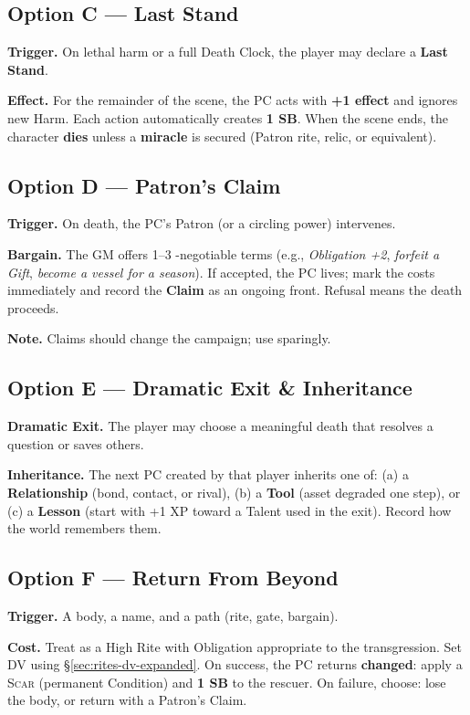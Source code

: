 \subsection*{Option C — Last Stand}\label{subsec:last-stand}
\textbf{Trigger.} On lethal harm or a full Death Clock, the player may declare a \textbf{Last Stand}.\par
\textbf{Effect.} For the remainder of the scene, the PC acts with \textbf{+1 effect} and ignores new Harm. Each action automatically creates \textbf{1 SB}. When the scene ends, the character \textbf{dies} unless a \textbf{miracle} is secured (Patron rite, relic, or equivalent).

\subsection*{Option D — Patron’s Claim}\label{subsec:patron-claim}
\textbf{Trigger.} On death, the PC’s Patron (or a circling power) intervenes.\par
\textbf{Bargain.} The GM offers 1–3 \non-negotiable terms (e.g., \emph{Obligation +2}, \emph{forfeit a Gift}, \emph{become a vessel for a season}). If accepted, the PC lives; mark the costs immediately and record the \textbf{Claim} as an ongoing front. Refusal means the death proceeds.\par
\textbf{Note.} Claims should change the campaign; use sparingly.

\subsection*{Option E — Dramatic Exit & Inheritance}\label{subsec:inheritance}
\textbf{Dramatic Exit.} The player may choose a meaningful death that resolves a question or saves others.\par
\textbf{Inheritance.} The next PC created by that player inherits one of: (a) a \textbf{Relationship} (bond, contact, or rival), (b) a \textbf{Tool} (asset degraded one step), or (c) a \textbf{Lesson} (start with +1 XP toward a Talent used in the exit). Record how the world remembers them.

\subsection*{Option F — Return From Beyond}\label{subsec:return}
\textbf{Trigger.} A body, a name, and a path (rite, gate, bargain).\par
\textbf{Cost.} Treat as a High Rite with Obligation appropriate to the transgression. Set DV using \S\ref{sec:rites-dv-expanded}. On success, the PC returns \textbf{changed}: apply a \textsc{Scar} (permanent Condition) and \textbf{1 SB} to the rescuer. On failure, choose: lose the body, or return with a Patron’s Claim.

